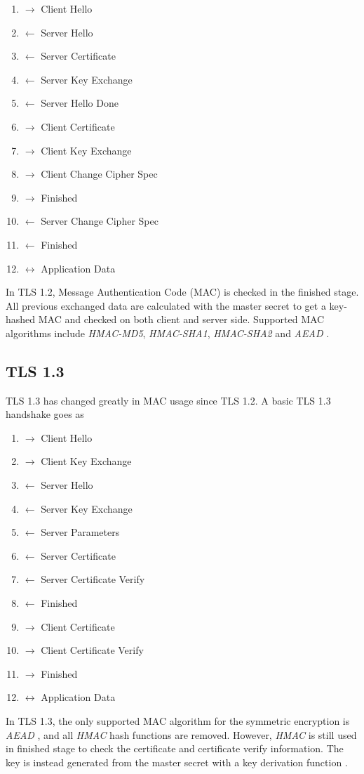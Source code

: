 	\begin{enumerate}[noitemsep]
		\item $\rightarrow$ Client Hello
		\item $\leftarrow$ Server Hello
		\item $\leftarrow$ Server Certificate
		\item $\leftarrow$ Server Key Exchange
		\item $\leftarrow$ Server Hello Done
		\item $\rightarrow$ Client Certificate
		\item $\rightarrow$ Client Key Exchange
		\item $\rightarrow$ Client Change Cipher Spec
		\item $\rightarrow$ Finished
		\item $\leftarrow$ Server Change Cipher Spec
		\item $\leftarrow$ Finished
		\item $\leftrightarrow$ Application Data
	\end{enumerate}

	In TLS 1.2, Message Authentication Code (MAC) is checked in the finished stage. All previous exchanged data are calculated with the master secret to get a key-hashed MAC and checked on both client and server side. Supported MAC algorithms include \emph{HMAC-MD5}, \emph{HMAC-SHA1}, \emph{HMAC-SHA2} and \emph{AEAD} \cite{tls-1-2}.

\subsection{TLS 1.3}
	TLS 1.3 has changed greatly in MAC usage since TLS 1.2. A basic TLS 1.3 handshake \cite{tls-1-3} goes as

	\begin{enumerate}[noitemsep]
		\item $\rightarrow$ Client Hello
		\item $\rightarrow$ Client Key Exchange
		\item $\leftarrow$ Server Hello
		\item $\leftarrow$ Server Key Exchange
		\item $\leftarrow$ Server Parameters
		\item $\leftarrow$ Server Certificate
		\item $\leftarrow$ Server Certificate Verify
		\item $\leftarrow$ Finished
		\item $\rightarrow$ Client Certificate
		\item $\rightarrow$ Client Certificate Verify
		\item $\rightarrow$ Finished
		\item $\leftrightarrow$ Application Data
	\end{enumerate}

	In TLS 1.3, the only supported MAC algorithm for the symmetric encryption is \emph{AEAD} \cite{tls-1-3}, and all \emph{HMAC} hash functions are removed. However, \emph{HMAC} is still used in finished stage to check the certificate and certificate verify information. The key is instead generated from the master secret with a key derivation function \cite{tls-1-3}.